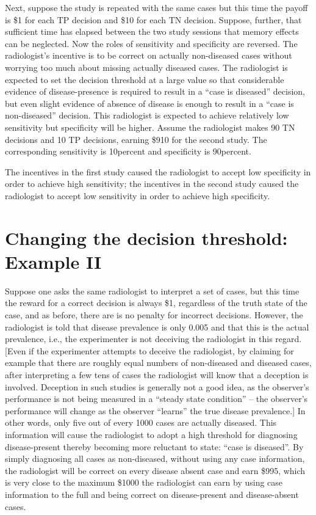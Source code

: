 \documentclass[
]{book}
\begin{document}
Next, suppose the study is repeated with the same cases but this time the payoff is \$1 for each TP decision and \$10 for each TN decision. Suppose, further, that sufficient time has elapsed between the two study sessions that memory effects can be neglected. Now the roles of sensitivity and specificity are reversed. The radiologist's incentive is to be correct on actually non-diseased cases without worrying too much about missing actually diseased cases. The radiologist is expected to set the decision threshold at a large value so that considerable evidence of disease-presence is required to result in a ``case is diseased'' decision, but even slight evidence of absence of disease is enough to result in a ``case is non-diseased'' decision. This radiologist is expected to achieve relatively low sensitivity but specificity will be higher. Assume the radiologist makes 90 TN decisions and 10 TP decisions, earning \$910 for the second study. The corresponding sensitivity is 10percent and specificity is 90percent.

The incentives in the first study caused the radiologist to accept low specificity in order to achieve high sensitivity; the incentives in the second study caused the radiologist to accept low sensitivity in order to achieve high specificity.

\hypertarget{changing-the-decision-threshold-example-ii}{%
\section{Changing the decision threshold: Example II}\label{changing-the-decision-threshold-example-ii}}

Suppose one asks the same radiologist to interpret a set of cases, but this time the reward for a correct decision is always \$1, regardless of the truth state of the case, and as before, there are is no penalty for incorrect decisions. However, the radiologist is told that disease prevalence is only 0.005 and that this is the actual prevalence, i.e., the experimenter is not deceiving the radiologist in this regard. {[}Even if the experimenter attempts to deceive the radiologist, by claiming for example that there are roughly equal numbers of non-diseased and diseased cases, after interpreting a few tens of cases the radiologist will know that a deception is involved. Deception in such studies is generally not a good idea, as the observer's performance is not being measured in a ``steady state condition'' -- the observer's performance will change as the observer ``learns'' the true disease prevalence.{]} In other words, only five out of every 1000 cases are actually diseased. This information will cause the radiologist to adopt a high threshold for diagnosing disease-present thereby becoming more reluctant to state: ``case is diseased''. By simply diagnosing all cases as non-diseased, without using any case information, the radiologist will be correct on every disease absent case and earn \$995, which is very close to the maximum \$1000 the radiologist can earn by using case information to the full and being correct on disease-present and disease-absent cases.
\end{document}
